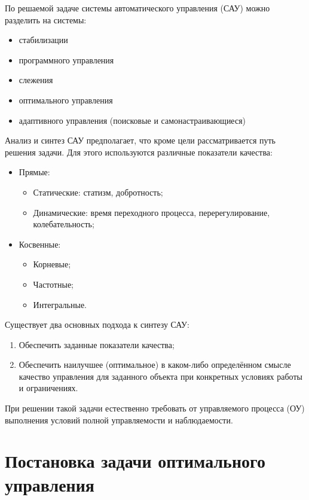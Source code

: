 \documentclass[preprint,russian,a5paper,10pt,twoside]{ncc}
\begin{document}
По решаемой задаче системы автоматического управления (САУ) можно разделить на системы:
\begin{itemize}
\item стабилизации
\item программного управления
\item слежения
\item оптимального управления
\item адаптивного управления (поисковые и самонастраивающиеся)
\end{itemize}

Анализ и синтез САУ предполагает, что кроме цели рассматривается путь решения задачи. Для этого используются различные показатели качества:
\begin{itemize}
\item Прямые:
	\begin{itemize}
	\item Статические: статизм, добротность;
	\item Динамические: время переходного процесса, перерегулирование, колебательность;
	\end{itemize}
\item Косвенные:
	\begin{itemize}
	\item Корневые;
	\item Частотные;
	\item Интегральные.
	\end{itemize}
\end{itemize}

Существует два основных подхода к синтезу САУ:
\begin{enumerate}
\item Обеспечить заданные показатели качества;
\item Обеспечить наилучшее (оптимальное) в каком-либо определённом смысле качество управления для заданного объекта при конкретных условиях работы и ограничениях.
\end{enumerate}

При решении такой задачи естественно требовать от управляемого процесса (ОУ) выполнения условий полной управляемости и наблюдаемости.

\newpage %

\section{Постановка задачи оптимального управления\label{task}}
\end{document}
